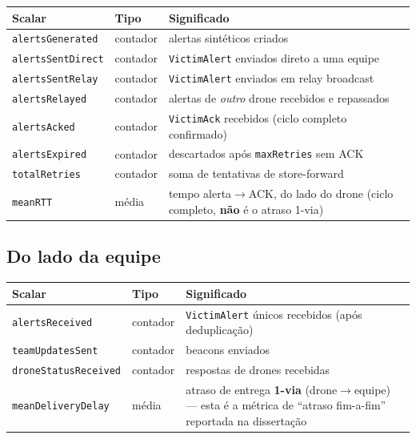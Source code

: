 \documentclass[11pt,a4paper]{article}
\begin{document}
\begin{center}
\begin{tabular}{@{}llp{6.7cm}@{}}
\toprule
\textbf{Scalar} & \textbf{Tipo} & \textbf{Significado} \\
\midrule
\texttt{alertsGenerated}  & contador & alertas sintéticos criados \\
\texttt{alertsSentDirect} & contador & \texttt{VictimAlert} enviados direto a uma equipe \\
\texttt{alertsSentRelay}  & contador & \texttt{VictimAlert} enviados em relay broadcast \\
\texttt{alertsRelayed}    & contador & alertas de \emph{outro} drone recebidos e repassados \\
\texttt{alertsAcked}      & contador & \texttt{VictimAck} recebidos (ciclo completo confirmado) \\
\texttt{alertsExpired}    & contador & descartados após \texttt{maxRetries} sem ACK \\
\texttt{totalRetries}     & contador & soma de tentativas de store-forward \\
\texttt{meanRTT}          & média & tempo alerta$\to$ACK, do lado do drone (ciclo completo, \textbf{não} é o atraso 1-via) \\
\bottomrule
\end{tabular}
\end{center}

\subsection{Do lado da equipe}

\begin{center}
\begin{tabular}{@{}llp{6.7cm}@{}}
\toprule
\textbf{Scalar} & \textbf{Tipo} & \textbf{Significado} \\
\midrule
\texttt{alertsReceived}      & contador & \texttt{VictimAlert} únicos recebidos (após deduplicação) \\
\texttt{teamUpdatesSent}     & contador & beacons enviados \\
\texttt{droneStatusReceived} & contador & respostas de drones recebidas \\
\texttt{meanDeliveryDelay}   & média & atraso de entrega \textbf{1-via} (drone$\to$equipe) --- esta é a métrica de ``atraso fim-a-fim'' reportada na dissertação \\
\bottomrule
\end{tabular}
\end{center}
\end{document}
